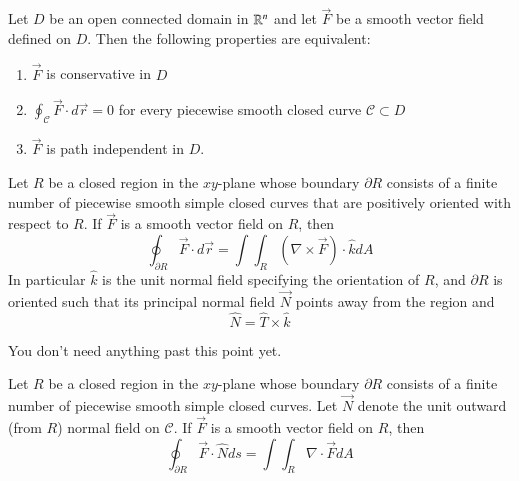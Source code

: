 \begin{appendices}
    
    \begin{thm}
        Let $D$ be an open connected domain in $\mathbb R^n$ and let $\vec{F}$ be a smooth vector field defined on $D$. Then the following properties are equivalent:\begin{enumerate}
            \item $\vec{F}$ is conservative in $D$ 
            \item $\oint_{\mathcal{C}} \vec{F}\cdot d\vec{r} = 0$ for every piecewise smooth closed curve $\mathcal{C} \subset D$ 
            \item $\vec{F}$ is path independent in $D$.
        \end{enumerate}
    \end{thm}
    
    \begin{namthm}
        Let $R$ be a closed region in the $xy$-plane whose boundary $\partial R$ consists of a finite number of piecewise smooth simple closed curves that are positively oriented with respect to $R$. If $\vec{F}$ is a smooth vector field on $R$, then \begin{equation}
            \oint_{\partial R}\vec{F}\cdot d\vec{r} = \int\int_{R}(\nabla \times \vec{F})\cdot \hat{k}dA
        \end{equation}
        In particular $\hat{k}$ is the unit normal field specifying the orientation of $R$, and $\partial R$ is oriented such that its principal normal field $\vec{N}$ points away from the region and \begin{equation}
            \hat{N} = \hat{T} \times \hat{k}
        \end{equation}
    \end{namthm}
    
    \begin{rmk}
        You don't need anything past this point yet.
    \end{rmk}
    
    \begin{namthm}
        Let $R$ be a closed region in the $xy$-plane whose boundary $\partial R$ consists of a finite number of piecewise smooth simple closed curves. Let $\vec{N}$ denote the unit outward (from $R$) normal field on $\mathcal{C}$. If $\vec{F}$ is a smooth vector field on $R$, then \begin{equation}
            \oint_{\partial R}\vec{F}\cdot \hat{N} ds = \int\int_{R}\nabla \cdot \vec{F}dA
        \end{equation}
    \end{namthm}
    

\end{appendices}
